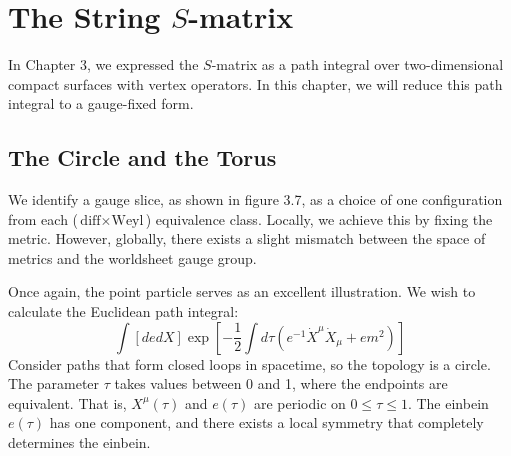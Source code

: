 \setcounter{section}{0}
\setcounter{chapter}{4}

\chapter{\texorpdfstring{The String $S$-matrix}{5 The string S-matrix}} \label{cha:5}

In Chapter 3, we expressed the $S$-matrix as a path integral over two-dimensional compact surfaces with vertex operators. In this chapter, we will reduce this path integral to a gauge-fixed form.

\section{The Circle and the Torus}\label{sec:5.1}

We identify a gauge slice, as shown in figure 3.7, as a choice of one configuration from each ($\text{diff} \times \text{Weyl}$) equivalence class. Locally, we achieve this by fixing the metric. However, globally, there exists a slight mismatch between the space of metrics and the worldsheet gauge group.

Once again, the point particle serves as an excellent illustration. We wish to calculate the Euclidean path integral:
\begin{equation}
	\int[d e d X] \exp \left[-\frac{1}{2} \int d \tau\left(e^{-1} \dot{X}^{\mu} \dot{X}_{\mu}+e m^{2}\right)\right]
\end{equation}
Consider paths that form closed loops in spacetime, so the topology is a circle. The parameter $\tau$ takes values between 0 and 1, where the endpoints are equivalent. That is, $X^{\mu}(\tau)$ and $e(\tau)$ are periodic on $0 \leq \tau \leq 1$. The einbein $e(\tau)$ has one component, and there exists a local symmetry that completely determines the einbein.

